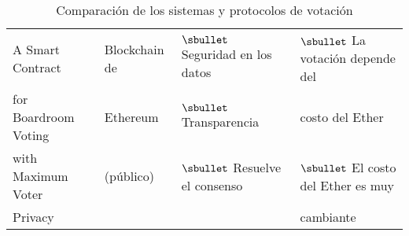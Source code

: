 \begin{table}[]
{\begin{tabular}{|l|l|l|l|}
         A Smart Contract & Blockchain de & $\sbullet$ Seguridad en los datos & $\sbullet$ La votación depende del \\
         for Boardroom Voting & Ethereum & $\sbullet$ Transparencia & costo del Ether \\
         with Maximum Voter & (público) & $\sbullet$ Resuelve el consenso  & $\sbullet$ El costo del Ether es muy \\
         Privacy \cite{mccorry2017smart} & & &  cambiante \\ \hline
    \end{tabular}
    }
    \caption{Comparación de los sistemas y protocolos de votación}
    \label{tab:compTR}
    
\end{table}



